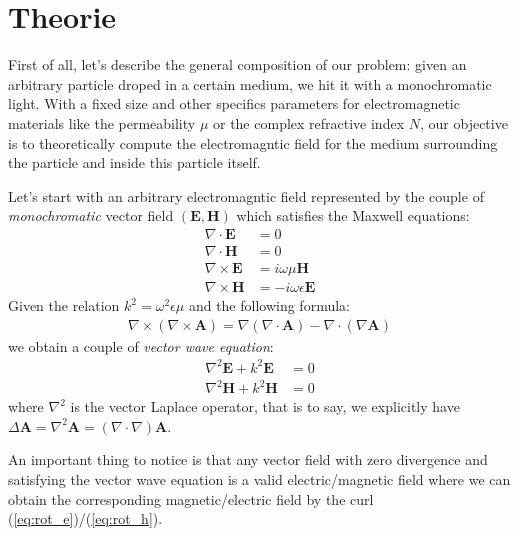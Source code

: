 \documentclass{article}
\begin{document}
\newpage

\section{Theorie}

First of all, let's describe the general composition of our problem: given an arbitrary particle droped in a certain medium, we hit it with a monochromatic light. With a fixed size and other specifics parameters for electromagnetic materials like the permeability $\mu$ or the complex refractive index $N$, our objective is to theoretically compute the electromagntic field for the medium surrounding the particle and inside this particle itself.

Let's start with an arbitrary electromagntic field represented by the couple of \textit{monochromatic} vector field $(\textbf{E}, \textbf{H})$ which satisfies the Maxwell equations:
\begin{align}
\nabla \cdot \textbf{E} &= 0\\
\nabla \cdot \textbf{H} &= 0\\
\nabla \times \textbf{E} &= i\omega \mu \textbf{H} \label{eq:rot_e} \\
\nabla \times \textbf{H} &= -i\omega \epsilon \textbf{E} \label{eq:rot_h}
\end{align}
Given the relation $k^{2} = \omega ^{2}\epsilon \mu$ and the following formula:
\begin{align}\label{eq:rot_rot_a}
\nabla \times (\nabla \times \textbf{A}) = \nabla (\nabla \cdot \textbf{A}) - \nabla \cdot (\nabla \textbf{A})
\end{align}
we obtain a couple of \textit{vector wave equation}:
\begin{align}
\nabla ^{2} \textbf{E} + k^{2}\textbf{E}&=0\\
\nabla ^{2} \textbf{H} + k^{2}\textbf{H}&=0
\end{align}
where $\nabla ^{2}$ is the vector Laplace operator, that is to say, we explicitly have $\Delta \textbf{A} = \nabla ^{2} \textbf{A} = (\nabla \cdot \nabla) \textbf{A}$.

An important thing to notice is that any vector field with zero divergence and satisfying the vector wave equation is a valid electric/magnetic field where we can obtain the corresponding magnetic/electric field by the curl (\ref{eq:rot_e})/(\ref{eq:rot_h}).
\end{document}
